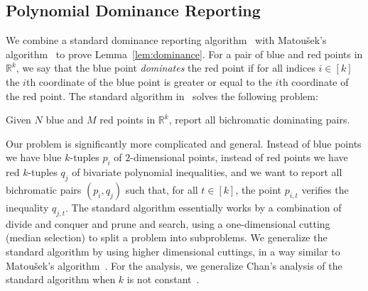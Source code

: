 \subsection{Polynomial Dominance Reporting}%
\label{sec:algo:dominance}


We combine a standard dominance reporting
algorithm~\cite{PS85} with Matou\v{s}ek's algorithm~\cite{Ma93} to prove
Lemma~\ref{lem:dominance}.
For a pair of blue and red points in $\mathbb{R}^k$, we say that the blue point
\emph{dominates} the red point if for all indices $i\in[k]$ the $i$th
coordinate of the blue point is greater or equal to the $i$th coordinate of the
red point.
The standard algorithm in~\cite{PS85} solves the following problem:
\begin{problem}
	Given $N$ blue
	and $M$ red points in $\mathbb{R}^k$, report all
	bichromatic dominating pairs.
\end{problem}
Our problem is significantly more complicated and general. Instead of blue points we
have blue $k$-tuples $p_i$ of $2$-dimensional points, instead of red points we have
red $k$-tuples $q_j$ of bivariate polynomial inequalities, and we want to report
all bichromatic pairs $(p_i,q_j)$ such that, for all $t \in [k]$,
the point $p_{i,t}$ verifies the inequality $q_{j,t}$.
The standard algorithm essentially works by a combination of divide and conquer
and prune and search, using a one-dimensional cutting (median selection) to
split a problem into subproblems. We generalize the standard algorithm by using
higher dimensional cuttings, in a way similar to Matou\v{s}ek's
algorithm~\cite{Ma93}. For the analysis, we generalize Chan's analysis
of the standard algorithm when $k$ is not constant~\cite{Cha08}.

